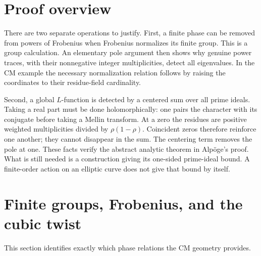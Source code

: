 \documentclass[11pt]{article}
\theoremstyle{definition}
\theoremstyle{remark}
\begin{document}
\section{Proof overview}

There are two separate operations to justify.  First, a finite phase can
be removed from powers of Frobenius when Frobenius normalizes its finite
group.  This is a group calculation.  An elementary pole argument then
shows why genuine power traces, with their nonnegative integer
multiplicities, detect all eigenvalues.  In the CM example the necessary
normalization relation follows by raising the coordinates to their
residue-field cardinality.

Second, a global $L$-function is detected by a centered sum over all prime
ideals.  Taking a real part must be done holomorphically: one pairs the
character with its conjugate before taking a Mellin transform.  At a zero
the residues are positive weighted multiplicities divided by
$\rho(1-\rho)$.  Coincident zeros therefore reinforce one another; they
cannot disappear in the sum.  The centering term removes the pole at one.
These facts verify the abstract analytic theorem in Alp\"oge's proof.
What is still needed is a construction giving its one-sided prime-ideal
bound.  A finite-order action on an elliptic curve does not give that
bound by itself.

\section{Finite groups, Frobenius, and the cubic twist}

This section identifies exactly which phase relations the CM geometry
provides.
\end{document}
